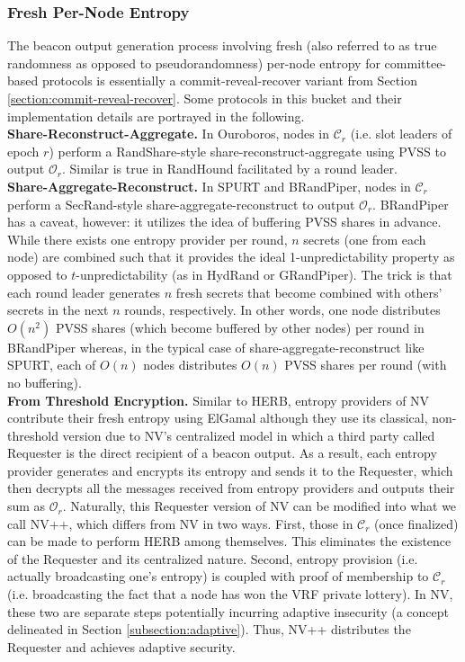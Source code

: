 \documentclass[letterpaper,twocolumn,10pt]{article}
\theoremstyle{definition}
\theoremstyle{remark}
\begin{document}
\subsubsection{Fresh Per-Node Entropy}
\label{subsubsection:fresh}
The beacon output generation process involving fresh (also referred to as true randomness \cite{cascudomt, das2021spurt} as opposed to pseudorandomness) per-node entropy for committee-based protocols is essentially a commit-reveal-recover variant from Section \ref{section:commit-reveal-recover}. Some protocols in this bucket and their implementation details are portrayed in the following.\\

\noindent\textbf{Share-Reconstruct-Aggregate.} In Ouroboros, nodes in $\mathcal{C}_r$ (i.e. slot leaders of epoch $r$) perform a RandShare-style share-reconstruct-aggregate using PVSS to output $\mathcal{O}_r$. Similar is true in RandHound facilitated by a round leader.\\

\noindent\textbf{Share-Aggregate-Reconstruct.} In SPURT and BRandPiper, nodes in $\mathcal{C}_r$ perform a SecRand-style share-aggregate-reconstruct to output $\mathcal{O}_r$. BRandPiper has a caveat, however: it utilizes the idea of buffering PVSS shares in advance. While there exists one entropy provider per round, $n$ secrets (one from each node) are combined such that it provides the ideal 1-unpredictability property as opposed to $t$-unpredictability (as in HydRand or GRandPiper). The trick is that each round leader generates $n$ fresh secrets that become combined with others' secrets in the next $n$ rounds, respectively. In other words, one node distributes $O(n^2)$ PVSS shares (which become buffered by other nodes) per round in BRandPiper whereas, in the typical case of share-aggregate-reconstruct like SPURT, each of $O(n)$ nodes distributes $O(n)$ PVSS shares per round (with no buffering).\\

\noindent\textbf{From Threshold Encryption.} Similar to HERB, entropy providers of NV \cite{nguyen2019scalable} contribute their fresh entropy using ElGamal although they use its classical, non-threshold version due to NV's centralized model in which a third party called Requester is the direct recipient of a beacon output. As a result, each entropy provider generates and encrypts its entropy and sends it to the Requester, which then decrypts all the messages received from entropy providers and outputs their sum as $\mathcal{O}_r$. Naturally, this Requester version of NV can be modified into what we call NV++, which differs from NV in two ways. First, those in $\mathcal{C}_r$ (once finalized) can be made to perform HERB among themselves. This eliminates the existence of the Requester and its centralized nature. Second, entropy provision (i.e. actually broadcasting one's entropy) is coupled with proof of membership to $\mathcal{C}_r$ (i.e. broadcasting the fact that a node has won the VRF private lottery). In NV, these two are separate steps potentially incurring adaptive insecurity (a concept delineated in Section \ref{subsection:adaptive}). Thus, NV++ distributes the Requester and achieves adaptive security.
\end{document}
